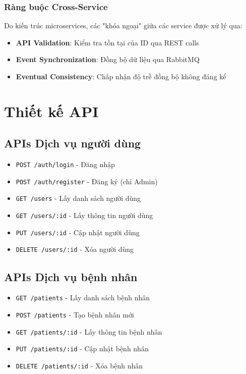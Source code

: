 \documentclass[12pt,a4paper]{report}
\begin{document}
    \subsubsection{Ràng buộc Cross-Service}
    Do kiến trúc microservices, các "khóa ngoại" giữa các service được xử lý qua:
    \begin{itemize}
        \item \textbf{API Validation}: Kiểm tra tồn tại của ID qua REST calls
        \item \textbf{Event Synchronization}: Đồng bộ dữ liệu qua RabbitMQ
        \item \textbf{Eventual Consistency}: Chấp nhận độ trễ đồng bộ không đáng kể
    \end{itemize}

    \section{Thiết kế API}

    \subsection{APIs Dịch vụ người dùng}
    \begin{itemize}
        \item \texttt{POST /auth/login} - Đăng nhập
        \item \texttt{POST /auth/register} - Đăng ký (chỉ Admin)
        \item \texttt{GET /users} - Lấy danh sách người dùng
        \item \texttt{GET /users/:id} - Lấy thông tin người dùng
        \item \texttt{PUT /users/:id} - Cập nhật người dùng
        \item \texttt{DELETE /users/:id} - Xóa người dùng
    \end{itemize}

    \subsection{APIs Dịch vụ bệnh nhân}
    \begin{itemize}
        \item \texttt{GET /patients} - Lấy danh sách bệnh nhân
        \item \texttt{POST /patients} - Tạo bệnh nhân mới
        \item \texttt{GET /patients/:id} - Lấy thông tin bệnh nhân
        \item \texttt{PUT /patients/:id} - Cập nhật bệnh nhân
        \item \texttt{DELETE /patients/:id} - Xóa bệnh nhân
    \end{itemize}
\end{document}
